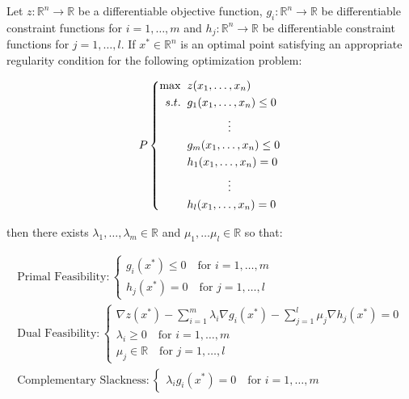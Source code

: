 \begin{theorem} Let $z : \mathbb{R}^n \rightarrow \mathbb{R}$ be a differentiable objective function, $g_i:\mathbb{R}^n \rightarrow \mathbb{R}$ be differentiable constraint functions for $i = 1,\dots,m$ and $h_j:\mathbb{R}^n \rightarrow \mathbb{R}$ be differentiable constraint functions for $j=1,\dots,l$. If ${x}^* \in \mathbb{R}^n$ is an optimal point satisfying an appropriate regularity condition for the following optimization problem:

\begin{displaymath}
P\left\{
\begin{aligned}
\max\;\;& z(x_1,\dots,x_n)\\
s.t.\;\;& g_1(x_1,\dots,x_n) \leq 0\\
& \hspace*{0.5in}\vdots\\
& g_m(x_1,\dots,x_n) \leq 0\\
& h_1(x_1,\dots,x_n) = 0\\
&\hspace*{0.5in}\vdots\\
&h_l(x_1,\dots,x_n) = 0
\end{aligned}
\right.
\end{displaymath}

then there exists $\lambda_1,\dots,\lambda_m \in \mathbb{R}$ and $\mu_1,\dots\mu_l \in \mathbb{R}$ so that:

\begin{gather*}
\text{Primal Feasibility}: \left\{
\begin{aligned}
g_i({x}^*) \leq 0 \quad \text{for $i = 1,\dots,m$}\\
h_j({x}^*) = 0 \quad \text{for $j = 1,\dots,l$}
\end{aligned}
\right.\\
\text{Dual Feasibility}:\left\{
\begin{aligned}
\nabla z({x}^*) - \sum_{i = 1}^m\lambda_i\nabla g_i({x}^*) - \sum_{j = 1}^{l}\mu_j\nabla h_j({x}^*) = {0}\\
\lambda_i \geq 0 \quad \text{for $i=1,\dots,m$}\\
\mu_j \in \mathbb{R} \quad \text{for $j = 1,\dots,l$}
\end{aligned}
\right.\\
\text{Complementary Slackness}:\left\{
\begin{aligned}
\lambda_ig_i({x}^*) = 0 \quad \text{for $i = 1,\dots,m$}
\end{aligned}
\right.
\end{gather*}
\label{thm:KKT7}
\end{theorem}

